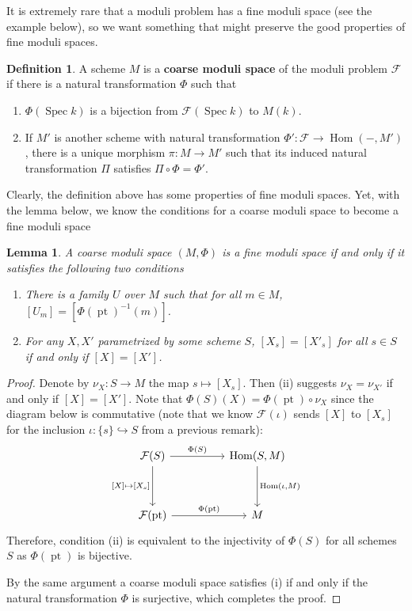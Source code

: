 \documentclass[12pt]{article}
\newtheorem{lemma}{Lemma}[section]
\theoremstyle{remark}
\theoremstyle{definition}
\newtheorem{definition}{Definition}[section]
\newcommand{\Spec}[0]{\operatorname{Spec}}
\newcommand{\Hom}[0]{\operatorname{Hom}}
\newcommand{\pt}{\operatorname{pt}}
\begin{document}
    It is extremely rare that a moduli problem has a fine moduli space (see the example below), so we want something that might preserve the good properties of fine moduli spaces.
    \begin{definition}
        A scheme $M$ is a \textbf{coarse moduli space} of the moduli problem $\mathcal F$ if there is a natural transformation $\Phi$ such that
        \begin{enumerate}[\normalfont(i)]
            \item $\Phi(\Spec k)$ is a bijection from $\mathcal F(\Spec k)$ to $M(k)$.
            \item If $M'$ is another scheme with natural transformation $\Phi':\mathcal F\to \Hom(-, M')$, there is a unique morphism $\pi:M\to M'$ such that its induced natural transformation $\Pi$ satisfies $ \Pi\circ\Phi=\Phi'$.
        \end{enumerate}
    \end{definition}
    Clearly, the definition above has some properties of fine moduli spaces. Yet, with the lemma below, we know the conditions for a coarse moduli space to become a fine moduli space
    \begin{lemma}
        A coarse moduli space $(M,\Phi)$ is a fine moduli space if and only if it satisfies the following two conditions
        \begin{enumerate}[\normalfont(i)]
            \item There is a family $U$ over $M$ such that for all $m\in M$, $[U_m]=[\Phi(\pt)^{-1}(m)]$.
            \item For any $X, X'$ parametrized by some scheme $S$, $[X_s]=[X'_s]$ for all $s\in S$ if and only if $[X]=[X']$.
        \end{enumerate}
    \end{lemma}
    \begin{proof}
        Denote by $\nu_X:S\to M$ the map $s\mapsto [X_s]$. Then (ii) suggests $\nu_X=\nu_{X'}$ if and only if $[X]=[X']$. Note that $\Phi(S)(X)=\Phi(\pt)\circ\nu_X$ since the diagram below is commutative (note that we know $\mathcal F(\iota)$ sends $[X]$ to $[X_s]$ for the inclusion $\iota:\{s\}\hookrightarrow S$ from a previous remark):
        \[
            \begin{tikzcd}
                \mathcal F(S) \arrow[rr, "\Phi(S)"] \arrow[dd, "{[X]\mapsto[X_s]}"'] &  & {\operatorname{Hom}(S,M)} \arrow[dd, "{\operatorname{Hom}(\iota,M)}"] \\
                                                                                     &  &                                                                       \\
                \mathcal F(\text{pt}) \arrow[rr, "\Phi(\text{pt})"]                  &  & M                                                                    
                \end{tikzcd}
        \]
        Therefore, condition (ii) is equivalent to the injectivity of $\Phi(S)$ for all schemes $S$ as $\Phi(\pt)$ is bijective.

        By the same argument a coarse moduli space satisfies (i) if and only if the natural transformation $\Phi$ is surjective, which completes the proof.
    \end{proof}
\end{document}
